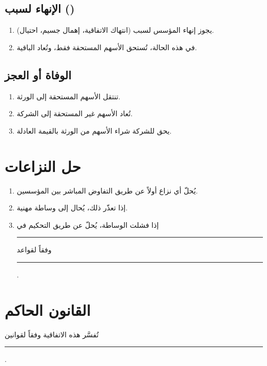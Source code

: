 \documentclass[12pt,a4paper]{article}
\begin{document}
\subsection{الإنهاء لسبب ()}
\begin{enumerate}
    \item يجوز إنهاء المؤسس لسبب (انتهاك الاتفاقية، إهمال جسيم، احتيال).
    \item في هذه الحالة، تُستحق الأسهم المستحقة فقط، وتُعاد الباقية.
\end{enumerate}

\subsection{الوفاة أو العجز}
\begin{enumerate}
    \item تنتقل الأسهم المستحقة إلى الورثة.
    \item تُعاد الأسهم غير المستحقة إلى الشركة.
    \item يحق للشركة شراء الأسهم من الورثة بالقيمة العادلة.
\end{enumerate}

\section{حل النزاعات}
\label{sec:dispute}

\begin{enumerate}
    \item يُحلّ أي نزاع أولاً عن طريق التفاوض المباشر بين المؤسسين.
    \item إذا تعذّر ذلك، يُحال إلى وساطة مهنية.
    \item إذا فشلت الوساطة، يُحلّ عن طريق التحكيم في \rule{4cm}{0.4pt} وفقاً لقواعد \rule{4cm}{0.4pt}.
\end{enumerate}

\section{القانون الحاكم}
\label{sec:law}
تُفسَّر هذه الاتفاقية وفقاً لقوانين \rule{6cm}{0.4pt}.

\vspace{2em}
\end{document}
